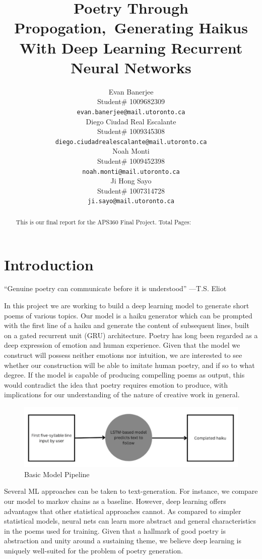 \documentclass{article} %
\title{Poetry Through Propogation,\ Generating Haikus With Deep Learning Recurrent Neural Networks}
\author{Evan Banerjee  \\
Student\# 1009682309\\
\texttt{evan.banerjee@mail.utoronto.ca} \\
\And
Diego Ciudad Real Escalante  \\
Student\# 1009345308 \\
\texttt{diego.ciudadrealescalante@mail.utoronto.ca} \\
\AND
Noah Monti  \\
Student\# 1009452398 \\
\texttt{noah.monti@mail.utoronto.ca} \\
\And
Ji Hong Sayo \\
Student\# 1007314728 \\
\texttt{ji.sayo@mail.utoronto.ca} \\
\AND
}
\begin{document}
\maketitle

\begin{abstract}
  This is our final report for the APS360 Final Project.
  Total Pages: \pageref{last_page}
\end{abstract}

\section{Introduction}

“Genuine poetry can communicate before it is understood” —T.S. Eliot

In this project we are working to build a deep learning model to generate short poems of various topics.
Our model is a haiku generator which can be prompted with the first line of a haiku and generate the content of subsequent lines, built on a gated recurrent unit (GRU) architecture.
Poetry has long been regarded as a deep expression of emotion and human experience. Given that the model we construct will possess neither emotions nor intuition, we are interested to see whether our construction will be able to imitate human poetry, and if so to what degree. If the model is capable of producing compelling poems as output, this would contradict the idea that poetry requires emotion to produce, with implications for our understanding of the nature of creative work in general.

\begin{figure}[h]
  \begin{center}
  \includegraphics[width=1\textwidth]{Figs/pipeline.png}
  \end{center}
  \caption{Basic Model Pipeline}
  \label{fig:Basic Model Pipeline}
\end{figure}

Several ML approaches can be taken to text-generation. For instance, we compare our model to markov chains as a baseline. However, deep learning offers advantages that other statistical approaches cannot. As compared to simpler statistical models, neural nets can learn more abstract and general characteristics in the poems used for training. Given that a hallmark of good poetry is abstraction and unity around a sustaining theme, we believe deep learning is uniquely well-suited for the problem of poetry generation. 
\end{document}
